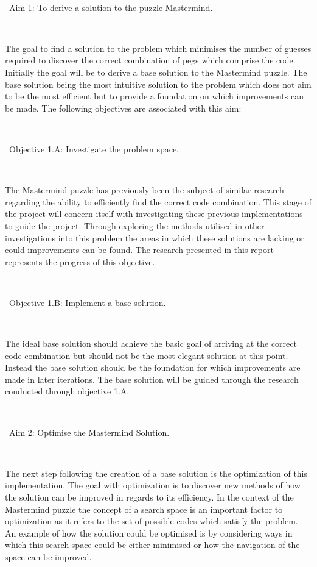 \documentclass[11pt]{article}  %
\theoremstyle{definition}
\theoremstyle{remark}
\begin{document}
\

\textbullet\ Aim 1: To derive a solution to the puzzle Mastermind.

\

The goal to find a solution to the problem which minimises the number of guesses required to discover the correct combination of
pegs which comprise the code. Initially the goal will be to derive a base solution to the Mastermind puzzle. The base solution being the
most intuitive solution to the problem which does not aim to be the most efficient but to provide a foundation on which improvements
can be made. The following objectives are associated with this aim:

\

\textbullet\ Objective 1.A: Investigate the problem space.

\

The Mastermind puzzle has previously been the subject of similar research regarding the ability to efficiently find the correct code
combination. This stage of the project will concern itself with investigating these previous implementations to guide the project.
Through exploring the methods utilised in other investigations into this problem the areas in which these solutions are lacking or could
improvements can be found. The research presented in this report represents the progress of this objective.

\

\textbullet\ Objective 1.B:  Implement a base solution.

\

The ideal base solution should achieve the basic goal of arriving at the correct code combination but should not be the most elegant
solution at this point. Instead the base solution should be the foundation for which improvements are made in later iterations.
The base solution will be guided through the research conducted through objective 1.A.

\

\textbullet\ Aim 2: Optimise the Mastermind Solution.

\

The next step following the creation of a base solution is the optimization of this implementation. The goal with optimization is to discover
new methods of how the solution can be improved in regards to its efficiency. In the context of the Mastermind puzzle the concept of a
search space is an important factor to optimization as it refers to the set of possible codes which satisfy the problem. An example of how
the solution could be optimised is by considering ways in which this search space could be either minimised or how the navigation of the
space can be improved.
\end{document}
